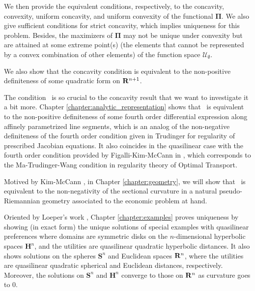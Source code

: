 We then provide the equivalent conditions, respectively, to the concavity, convexity, uniform concavity, and uniform convexity of the functional $\pmb\Pi$. We also give sufficient conditions for strict concavity, which implies uniqueness for this problem. Besides, the maximizers of $\pmb\Pi$ may not be unique under convexity but are attained at some extreme point(s) (the elements that cannot be represented by a convex combination of other elements) of the function space $\mathcal{U}_{\emptyset}$.\medskip 

We also show that the concavity condition is equivalent to the non-positive definiteness of some quadratic form on ${\mathbf R}^{n+1}$. \medskip

The condition \Gthree~is so crucial to the concavity result that we want to investigate it a bit more. Chapter \ref{chapter:analytic_representation} shows that \Gthree~is equivalent to the non-positive definiteness of some fourth order differential expression along affinely parametrized line segments, which is an analog of the non-negative definiteness of the fourth order condition given in Trudinger \cite{Trudinger14} for regularity of prescribed Jacobian equations. It also coincides in the quasilinear case with the fourth order condition provided by Figalli-Kim-McCann in \cite{FigalliKimMcCann11}, which corresponds to the Ma-Trudinger-Wang condition \cite{MaTrudingerWang05} in regularity theory of Optimal Transport.\medskip

Motived by Kim-McCann \cite{KimMcCann10}, in Chapter \ref{chapter:geometry}, we will show that \Gthree~is equivalent to the non-negativity of the sectional curvature in a natural pseudo-Riemannian geometry associated to the economic problem at hand.\medskip




Oriented by Loeper's work \cite{Loeper09}, Chapter \ref{chapter:examples} proves uniqueness by showing (in exact form) the unique solutions of special examples with quasilinear preferences where domains are symmetric disks on the $n$-dimensional hyperbolic spaces $\mathbf{H}^n$, and the utilities are quasilinear quadratic hyperbolic distances. It also shows solutions on the spheres $\mathbf{S}^n$ and Euclidean spaces ${\mathbf R}^n$, where the utilities are quasilinear quadratic spherical and Euclidean distances, respectively. Moreover, the solutions on $\mathbf{S}^n$ and $\mathbf{H}^n$ converge to those on ${\mathbf R}^n$ as curvature goes to $0$.
\medskip






